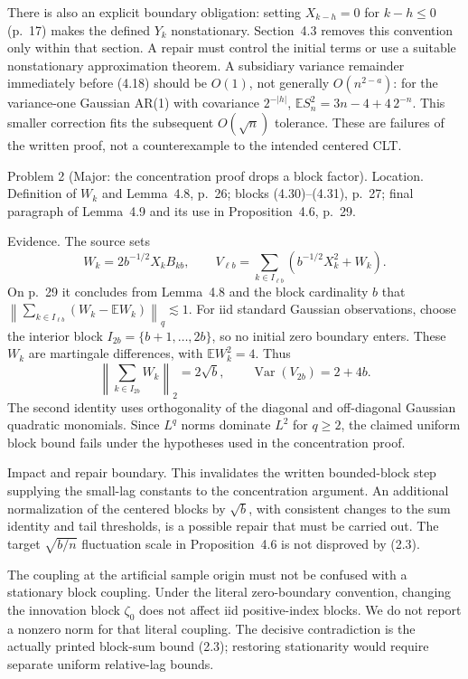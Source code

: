 \documentclass[10pt]{article}
\begin{document}
There is also an explicit boundary obligation: setting \(X_{k-h}=0\) for \(k-h\le0\) (p. 17) makes the defined \(Y_k\) nonstationary. Section 4.3 removes this convention only within that section. A repair must control the initial terms or use a suitable nonstationary approximation theorem. A subsidiary variance remainder immediately before (4.18) should be \(O(1)\), not generally \(O(n^{2-a})\): for the variance-one Gaussian AR(1) with covariance \(2^{-|h|}\), \(\mathbb ES_n^2=3n-4+4\,2^{-n}\). This smaller correction fits the subsequent \(O(\sqrt n)\) tolerance. These are failures of the written proof, not a counterexample to the intended centered CLT.\par
Problem 2 (Major: the concentration proof drops a block factor).  Location. Definition of \(W_k\) and Lemma 4.8, p. 26; blocks (4.30)–(4.31), p. 27; final paragraph of Lemma 4.9 and its use in Proposition 4.6, p. 29.\par
Evidence. The source sets \[W_k=2b^{-1/2}X_kB_{kb},\qquad
V_{\ell b}=\sum_{k\in I_{\ell b}}(b^{-1/2}X_k^2+W_k).\] On p. 29 it concludes from Lemma 4.8 and the block cardinality \(b\) that \(\left\|\sum_{k\in I_{\ell b}}(W_k-\mathbb EW_k)\right\|_q\lesssim1\). For iid standard Gaussian observations, choose the interior block \(I_{2b}=\{b+1,\ldots,2b\}\), so no initial zero boundary enters. These \(W_k\) are martingale differences, with \(\mathbb EW_k^2=4\). Thus \[\left\|\sum_{k\in I_{2b}}W_k\right\|_2=2\sqrt b,\qquad
\operatorname{Var}(V_{2b})=2+4b.                                \tag{2.3}\] The second identity uses orthogonality of the diagonal and off-diagonal Gaussian quadratic monomials. Since \(L^q\) norms dominate \(L^2\) for \(q\ge2\), the claimed uniform block bound fails under the hypotheses used in the concentration proof.\par
Impact and repair boundary. This invalidates the written bounded-block step supplying the small-lag constants to the concentration argument. An additional normalization of the centered blocks by \(\sqrt b\), with consistent changes to the sum identity and tail thresholds, is a possible repair that must be carried out. The target \(\sqrt{b/n}\) fluctuation scale in Proposition 4.6 is not disproved by (2.3).\par
The coupling at the artificial sample origin must not be confused with a stationary block coupling. Under the literal zero-boundary convention, changing the innovation block \(\zeta_0\) does not affect iid positive-index blocks. We do not report a nonzero norm for that literal coupling. The decisive contradiction is the actually printed block-sum bound (2.3); restoring stationarity would require separate uniform relative-lag bounds.\par
\end{document}
